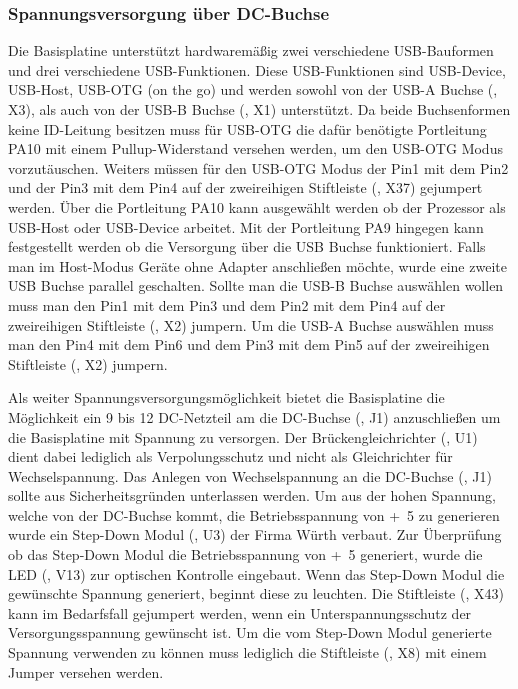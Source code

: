 \subsubsection{Spannungsversorgung über DC-Buchse}
Die \gls{Basisplatine} unterstützt hardwaremäßig zwei verschiedene USB-Bauformen und drei verschiedene USB-Funktionen. Diese USB-Funktionen sind USB-Device, USB-Host, USB-OTG (on the go) und werden sowohl von der USB-A Buchse (, X3), als auch von der USB-B Buchse (, X1) unterstützt. Da beide Buchsenformen keine ID-Leitung besitzen muss für USB-OTG die dafür benötigte Portleitung PA10 mit einem Pullup-Widerstand versehen werden, um den USB-OTG Modus vorzutäuschen. Weiters müssen für den USB-OTG Modus der Pin1 mit dem Pin2 und der Pin3 mit dem Pin4 auf der zweireihigen Stiftleiste (, X37) gejumpert werden. Über die Portleitung PA10 kann ausgewählt werden ob der Prozessor als USB-Host oder USB-Device arbeitet. Mit der Portleitung PA9 hingegen kann festgestellt werden ob die Versorgung über die USB Buchse funktioniert. Falls man im Host-Modus Geräte ohne Adapter anschließen möchte, wurde eine zweite USB Buchse parallel geschalten.  Sollte man die USB-B Buchse auswählen wollen muss man den Pin1 mit dem Pin3 und dem Pin2 mit dem Pin4 auf der zweireihigen Stiftleiste (, X2) jumpern. Um die USB-A Buchse auswählen muss man den Pin4 mit dem Pin6 und dem Pin3 mit dem Pin5 auf der zweireihigen Stiftleiste (, X2) jumpern.

Als weiter Spannungsversorgungsmöglichkeit bietet die \gls{Basisplatine} die Möglichkeit ein \unit{9}{\volt} bis \unit{12}{\volt} DC-Netzteil am die DC-Buchse (, J1) anzuschließen um die Basisplatine mit Spannung zu versorgen. Der Brückengleichrichter (, U1) dient dabei lediglich als Verpolungsschutz und nicht als Gleichrichter für Wechselspannung. Das Anlegen von Wechselspannung an die DC-Buchse (, J1) sollte aus Sicherheitsgründen unterlassen werden. Um aus der hohen Spannung, welche von der DC-Buchse kommt, die Betriebsspannung von \unit{+5}{\volt} zu generieren wurde ein Step-Down Modul (, U3) der Firma Würth verbaut. Zur Überprüfung ob das Step-Down Modul die Betriebsspannung von \unit{+5}{\volt} generiert, wurde die LED (, V13) zur optischen Kontrolle eingebaut. Wenn das Step-Down Modul die gewünschte Spannung generiert, beginnt diese zu leuchten. Die Stiftleiste (, X43) kann im Bedarfsfall gejumpert werden, wenn ein Unterspannungsschutz der Versorgungsspannung gewünscht ist. Um die vom Step-Down Modul generierte Spannung verwenden zu können muss lediglich die Stiftleiste (, X8) mit einem Jumper versehen werden.

